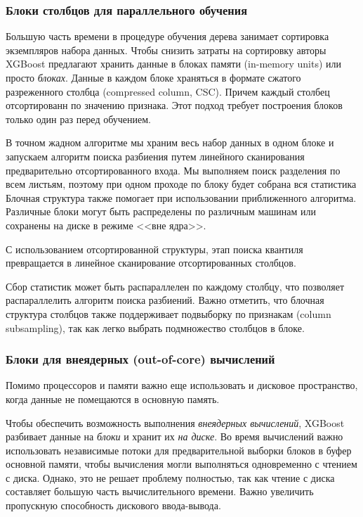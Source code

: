 \documentclass[%
	11pt,
	a4paper,
	utf8,
		]{article}
\begin{document}
\subsubsection{Блоки столбцов для параллельного обучения}

Большую часть времени в процедуре обучения дерева занимает сортировка экземпляров набора данных. Чтобы снизить затраты на сортировку авторы XGBoost предлагают хранить данные в блоках памяти (in-memory units) или просто \emph{блоках}. Данные в каждом блоке храняться в формате сжатого разреженного столбца (compressed column, CSC). Причем каждый столбец отсортированн по значению признака. Этот подход требует построения блоков только один раз перед обучением.

В точном жадном алгоритме мы храним весь набор данных в одном блоке и запускаем алгоритм поиска разбиения путем линейного сканирования предварительно отсортированного входа. Мы выполняем поиск разделения по всем листьям, поэтому при одном проходе по блоку будет собрана вся статистика  Блочная структура также помогает при использовании приближенного алгоритма. Различные блоки могут быть распределены по различным машинам или сохранены на диске в режиме <<вне ядра>>.

С использованием отсортированной структуры, этап поиска квантиля превращается в линейное сканирование отсортированных столбцов.

Сбор статистик может быть распараллелен по каждому столбцу, что позволяет распараллелить алгоритм поиска разбиений. Важно отметить, что блочная структура столбцов также поддерживает подвыборку по признакам (column subsampling), так как легко выбрать подмножество столбцов в блоке.

\subsubsection{Блоки для внеядерных (out-of-core) вычислений}

Помимо процессоров и памяти важно еще использовать и дисковое пространство, когда данные не помещаются в основную память.

Чтобы обеспечить возможность выполнения \emph{внеядерных вычислений}, XGBoost разбивает данные на \emph{блоки} и хранит их \emph{на диске}. Во время вычислений важно использовать независимые потоки для предварительной выборки блоков в буфер основной памяти, чтобы вычисления могли выполняться одновременно с чтением с диска. Однако, это не решает проблему полностью, так как чтение с диска составляет большую часть вычислительного времени. Важно увеличить пропускную способность дискового ввода-вывода.
\end{document}
